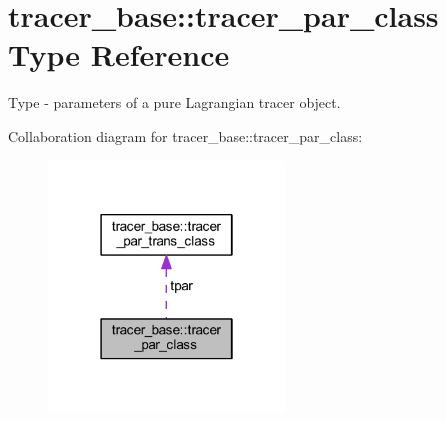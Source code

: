 \hypertarget{structtracer__base_1_1tracer__par__class}{}\section{tracer\+\_\+base\+:\+:tracer\+\_\+par\+\_\+class Type Reference}
\label{structtracer__base_1_1tracer__par__class}


Type -\/ parameters of a pure Lagrangian tracer object.  




Collaboration diagram for tracer\+\_\+base\+:\+:tracer\+\_\+par\+\_\+class\+:\nopagebreak
\begin{figure}[H]
\begin{center}
\leavevmode
\includegraphics[width=178pt]{structtracer__base_1_1tracer__par__class__coll__graph}
\end{center}
\end{figure}
